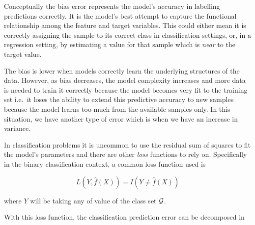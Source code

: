 

Conceptually the bias error represents the model's accuracy in labelling predictions correctly.
It is the model's best attempt to capture the functional relationship among the feature and target variables.
This could either mean it is correctly assigning the sample to its correct class in classification settings, or, in a regression setting, by estimating a value for that sample which is \textit{near} to the target value.

The bias is lower when models correctly learn the underlying structures of the data.
However, as bias decreases, the model complexity increases and more data is needed to train it correctly because the model becomes very fit to the training set i.e.\ it loses the ability to extend this predictive accuracy to new samples because the model learns too much from the available samples only.
In this situation, we have another type of error which is when we have an increase in variance.



In classification problems it is uncommon to use the residual sum of squares to fit the model's parameters and there are other \textit{loss} functions to rely on.
Specifically in the binary classification context, a common loss function used is

\begin{equation}
L(Y, \hat{f}(X)) = I(Y \neq \hat{f}(X))
\end{equation}\label{eq:classificationLossFunction}

where $Y$ will be taking any of value of the class set $\operatorname{\mathcal{G}}$.

With this loss function, the classification prediction error can be decomposed in



